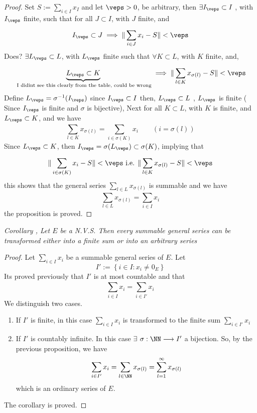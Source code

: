 \begin{proof}
	Set $S := \sum_{i \in  I}^{} x_{I} $  and let $\veps  > 0 $, be
	arbitrary, then 
	$\exists I_{\veps }\subset I $ , with $I_{\veps } $ 
	finite, such that for all $J \subset I $, with $J $  
	finite, and 
	\[
	I_{\veps } \subset J \implies 
	\| \sum_{i \in  J}^{ } x_{i} -S   \|  <  \veps 
	\]
	\divider 
	Does? $\exists L_{\veps } \subset  L$, with
	$L_{\veps } $ finite such that $\forall  K \subset L $, 
	with $K $ finite, and,
	\[
	\underbrace{
	L_{\veps }  \subset K 
	}_{\text{ I didint see this clearly from the table, could be wrong} } 
	 \implies 
	\| \sum_{l \in  K}^{} x_{\sigma (l)   } - S \|  <  \veps 
	\]
	Define $L_{\veps } = \sigma ^{-1}(I_\veps)    $   
	since $I_{\veps } \subset I$ then, 
	$L_{\veps } \subset L $ , $L_{\veps } $ is finite ( Since
	$I_{\veps } $ is finite and $\sigma    $  is bijective), 
	Next for all $K \subset L $, with $K $ is finite, and 
	$L_{\veps } \subset K $,  and we have 
	\[
	\sum_{l \in  K}^{} x_{\sigma (l)   } = 
	\sum_{i \in  \sigma (K)   }^{}  
	x_{i} \quad 
	\quad  (i = \sigma (l)   ) 
	\]
	Since $L_{\veps } \subset  K$, then 
	$I_{\veps } = \sigma (L_{\veps }) \subset  
	\sigma (K)   $, implying that 
	\[
	\| \sum_{i \in  \sigma (K)   }^{} x_{i} - S \|  <  \veps  
	\text{  i.e. }  
	\| \sum_{l \in  K}^{} x_{\sigma (l)   }  - S\|  <  \veps 
	\]
	this shows that the general series $\sum_{l \in  L}^{} 
	x_{\sigma (l)   }$  
	is summable and we have 
	\[
	\sum_{l \in  L}^{} x_{\sigma (l)   } = 
	\sum_{ i \in  I}^{}  x_{i}
	\]
	the proposition is proved.
\end{proof}


\divider
\it  Corollary \normalfont, Let 
$E $ be a N.V.S. Then every summable general series 
can be transformed either into a finite sum or into an arbitrary
series 
\divider
\begin{proof}
Let $\sum_{i \in I}^{} x_{i} $  
be a summable general series of $E$. Let 
\[
I' := 
\left\{ i \in I: x_{i} \neq  0_{E } \right\}
\]
Its proved previously that $I' $  is at most countable and that 
\[
\sum_{i \in  I}^{}  
x_{i} = 
\sum_{i \in I'}^{} x_{i}
\]
We distinguish two cases.
\begin{enumerate}
\item If $I' $ is finite, in this case $\sum_{i \in  I}^{}  x_{i}$   
	is transformed to the finite sum $\sum_{i \in  I'}^{} 
	x_{i}$ 
\item If $I' $  is countably infinite. In this 
	case $\exists  $ $ \sigma    : \NN \longrightarrow 
	I'$  a bijection. So, by the previous proposition, we have
	 \[
	 \sum_{i \in  I'}^{}  x_{i} =
	 \sum_{l \in  \NN}^{}  x_{\sigma (l)   } = 
	 \sum_{l=1}^{\infty } x_{\sigma (l)   }
	 \]
	 which is an ordinary series of $E $. 
\end{enumerate}
	 The corollary is proved.
\end{proof}

